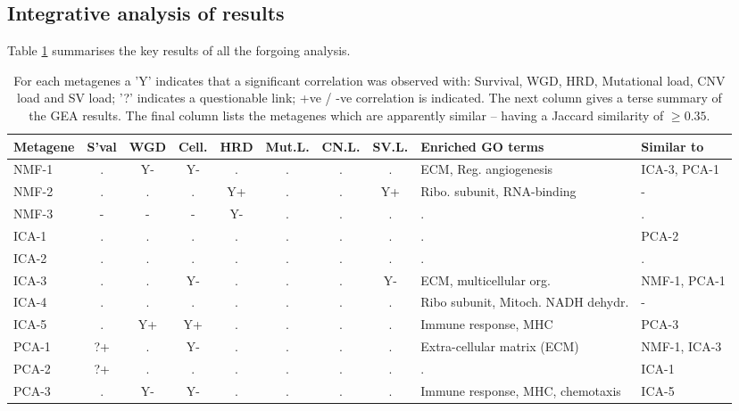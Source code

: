 \documentclass[tikz, 12pt,a4paper,oneside,fleqn]{article}
\begin{document}
\FloatBarrier

\subsection{Integrative analysis of results}
\label{sec-integrative-analysis}

Table \ref{tab-integrative-analysis} summarises the key results of all the forgoing analysis.  
 
\begin{table}[htb!]
\begin{center}
\begingroup
\scriptsize
\renewcommand{\arraystretch}{1.4} %
\begin{tabular}{|l||c|c|c|c|c|c|c|l|l|}
\hline
Metagene & S'val & WGD & Cell. & HRD & Mut.L. & CN.L. & SV.L. & Enriched GO terms & Similar to\\
\hline
NMF-1 & . & Y-& Y-& . & . & . & . & ECM, Reg. angiogenesis & ICA-3, PCA-1 \\
NMF-2 & . & . & . & Y+& . & . & Y+& Ribo. subunit, RNA-binding & - \\
NMF-3 & - & - & - & Y-& . & . & . & . & . \\
\hline
ICA-1 & . & . & . & . & . & . & . & . & PCA-2 \\
ICA-2 & . & . & . & . & . & . & . & . & . \\
ICA-3 & . & . & Y-& . & . & . & Y-& ECM, multicellular org. & NMF-1, PCA-1 \\
ICA-4 & . & . & . & . & . & . & . & Ribo subunit, Mitoch. NADH dehydr. & - \\
ICA-5 & . & Y+& Y+& . & . & . & . & Immune response, MHC & PCA-3 \\
\hline
PCA-1 & ?+& . & Y-& . & . & . & . & Extra-cellular matrix (ECM)& NMF-1, ICA-3 \\
PCA-2 & ?+& . & . & . & . & . & . & . & ICA-1 \\
PCA-3 & . & Y-& Y-& . & . & . & . & Immune response, MHC, chemotaxis & ICA-5 \\
\hline
\end{tabular}
\endgroup
\end{center}
\caption{For each metagenes a 'Y' indicates that a significant correlation was observed with: Survival, WGD, HRD, Mutational load,  CNV load and SV load;  '?' indicates a questionable link; +ve / -ve correlation is indicated.  The next column gives a terse summary of the GEA results.  The final column lists the metagenes which are apparently similar -- having a Jaccard similarity of $\geq 0.35$.}
\label{tab-integrative-analysis}
\end{table}
\end{document}
